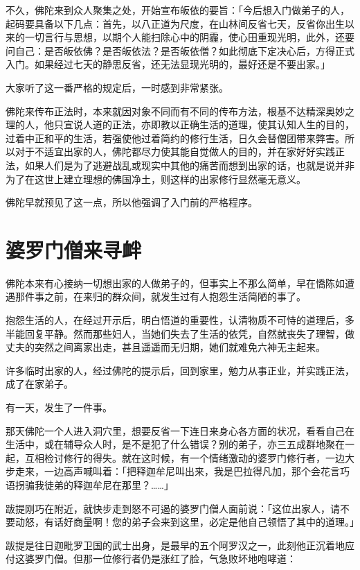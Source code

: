 \documentclass[twoside,openany]{book}
\begin{document}
不久，佛陀来到众人聚集之处，开始宣布皈依的要旨：「今后想入门做弟子的人，起码要具备以下几点：首先，以八正道为尺度，在山林间反省七天，反省你出生以来的一切言行与思想，以期个人能扫除心中的阴霾，使心田重现光明，此外，还要问自己：是否皈依佛？是否皈依法？是否皈依僧？如此彻底下定决心后，方得正式入门。如果经过七天的静思反省，还无法显现光明的，最好还是不要出家。」

大家听了这一番严格的规定后，一时感到非常紧张。

佛陀来传布正法时，本来就因对象不同而有不同的传布方法，根基不达精深奥妙之理的人，他只宣说人道的正法，亦即教以正确生活的道理，使其认知人生的目的，过着中正和平的生活，若强使他过着简约的修行生活，日久会替僧团带来弊害。所以对于不适宜出家的人，佛陀都尽力使其能自觉做人的目的，并在家好好实践正法，如果人们是为了逃避战乱或现实中其他的痛苦而想到出家的话，也就是说并非为了在这世上建立理想的佛国净土，则这样的出家修行显然毫无意义。

佛陀早就预见了这一点，所以他强调了入门前的严格程序。

\section{婆罗门僧来寻衅}\label{sec3.9}

佛陀本来有心接纳一切想出家的人做弟子的，但事实上不那么简单，早在憍陈如遭遇那件事之前，在来归的群众间，就发生过有人抱怨生活简陋的事了。

抱怨生活的人，在经过开示后，明白悟道的重要性，认清物质不可恃的道理后，多半能回复平静。然而那些妇人，当她们失去了生活的依凭，自然就丧失了理智，做丈夫的突然之间离家出走，甚且遥遥而无归期，她们就难免六神无主起来。

许多临时出家的人，经过佛陀的提示后，回到家里，勉力从事正业，并实践正法，成了在家弟子。

有一天，发生了一件事。

那天佛陀一个人进入洞穴里，想要反省一下连日来身心各方面的状况，看看自己在生活中，或在辅导众人时，是不是犯了什么错误？别的弟子，亦三五成群地聚在一起，互相检讨修行的得失。就在这时候，有一个情绪激动的婆罗门修行者，一边大步走来，一边高声喊叫着：「把释迦牟尼叫出来，我是巴拉得凡加，那个会花言巧语拐骗我徒弟的释迦牟尼在那里？……」

跋提刚巧在附近，就快步走到怒不可遏的婆罗门僧人面前说：「这位出家人，请不要动怒，有话好商量啊！您的弟子会来到这里，必定是他自己领悟了其中的道理。」

跋提是往日迦毗罗卫国的武士出身，是最早的五个阿罗汉之一，此刻他正沉着地应付这婆罗门僧。但那一位修行者仍是涨红了脸，气急败坏地咆哮道：
\end{document}
